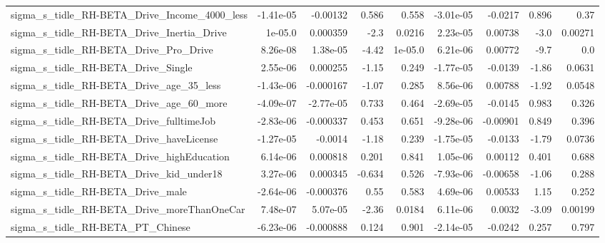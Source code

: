 \begin{tabular}{lrrrrrrrr}
sigma\_s\_tidle\_RH-BETA\_Drive\_Income\_4000\_less       &   -1.41e-05 &     -0.00132 &    0.586 &    0.558 &  -3.01e-05 &     -0.0217 &        0.896 &          0.37 \\
sigma\_s\_tidle\_RH-BETA\_Drive\_Inertia\_Drive          &     1e-05.0 &     0.000359 &     -2.3 &   0.0216 &   2.23e-05 &     0.00738 &         -3.0 &       0.00271 \\
sigma\_s\_tidle\_RH-BETA\_Drive\_Pro\_Drive              &    8.26e-08 &     1.38e-05 &    -4.42 &  1e-05.0 &   6.21e-06 &     0.00772 &         -9.7 &           0.0 \\
sigma\_s\_tidle\_RH-BETA\_Drive\_Single                 &    2.55e-06 &     0.000255 &    -1.15 &    0.249 &  -1.77e-05 &     -0.0139 &        -1.86 &        0.0631 \\
sigma\_s\_tidle\_RH-BETA\_Drive\_age\_35\_less            &   -1.43e-06 &    -0.000167 &    -1.07 &    0.285 &   8.56e-06 &     0.00788 &        -1.92 &        0.0548 \\
sigma\_s\_tidle\_RH-BETA\_Drive\_age\_60\_more            &   -4.09e-07 &    -2.77e-05 &    0.733 &    0.464 &  -2.69e-05 &     -0.0145 &        0.983 &         0.326 \\
sigma\_s\_tidle\_RH-BETA\_Drive\_fulltimeJob            &   -2.83e-06 &    -0.000337 &    0.453 &    0.651 &  -9.28e-06 &    -0.00901 &        0.849 &         0.396 \\
sigma\_s\_tidle\_RH-BETA\_Drive\_haveLicense            &   -1.27e-05 &      -0.0014 &    -1.18 &    0.239 &  -1.75e-05 &     -0.0133 &        -1.79 &        0.0736 \\
sigma\_s\_tidle\_RH-BETA\_Drive\_highEducation          &    6.14e-06 &     0.000818 &    0.201 &    0.841 &   1.05e-06 &     0.00112 &        0.401 &         0.688 \\
sigma\_s\_tidle\_RH-BETA\_Drive\_kid\_under18            &    3.27e-06 &     0.000345 &   -0.634 &    0.526 &  -7.93e-06 &    -0.00658 &        -1.06 &         0.288 \\
sigma\_s\_tidle\_RH-BETA\_Drive\_male                   &   -2.64e-06 &    -0.000376 &     0.55 &    0.583 &   4.69e-06 &     0.00533 &         1.15 &         0.252 \\
sigma\_s\_tidle\_RH-BETA\_Drive\_moreThanOneCar         &    7.48e-07 &     5.07e-05 &    -2.36 &   0.0184 &   6.11e-06 &      0.0032 &        -3.09 &       0.00199 \\
sigma\_s\_tidle\_RH-BETA\_PT\_Chinese                   &   -6.23e-06 &    -0.000888 &    0.124 &    0.901 &  -2.14e-05 &     -0.0242 &        0.257 &         0.797 \\

\end{tabular}
